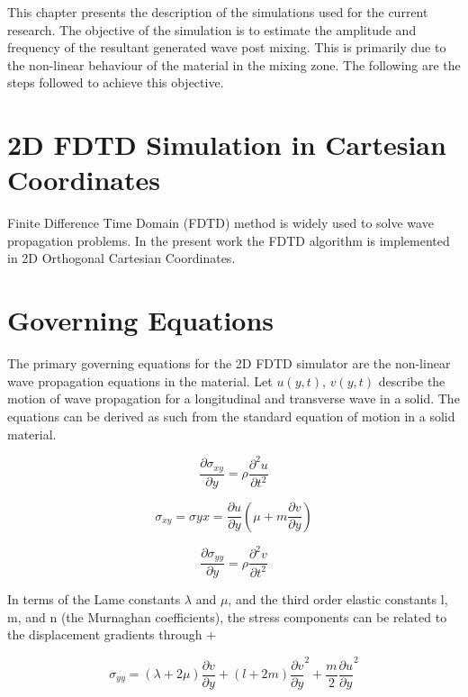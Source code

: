 This chapter presents the description of the simulations used for the current research. The objective of the simulation is to estimate the amplitude and frequency of the resultant generated wave post mixing. This is primarily due to the non-linear behaviour of the material in the mixing zone. The following are the steps followed to achieve this objective.


\section{2D FDTD Simulation in Cartesian Coordinates}
Finite Difference Time Domain (FDTD) method is widely used to solve wave propagation problems. In the present work the FDTD algorithm is implemented in 2D Orthogonal Cartesian Coordinates. \cite{yee}
\section{Governing Equations}
The primary governing equations for the 2D FDTD simulator are the non-linear wave propagation equations in the material. Let $u(y,t)$, $v(y,t)$ describe the motion of wave propagation for a longitudinal and transverse wave in a solid.  The equations can be derived as such from the standard equation of motion in a solid material.


\begin{equation}
\frac{\partial \sigma_{xy}}{\partial y} = \rho \frac{\partial^2 u}{\partial t^2}
\end{equation}

\begin{equation}
\sigma_{xy} = \sigma{yx} = \frac{\partial u}{\partial y}(\mu + m\frac{\partial v}{\partial y})
\end{equation}

\begin{equation}
\frac{\partial \sigma_{yy}}{\partial y} = \rho \frac{\partial^2 v}{\partial t^2}
\end{equation}

In terms of the Lame constants $\lambda$ and $\mu$, and the third order elastic constants l, m, and n (the Murnaghan coefficients), the stress components can be related to the displacement gradients through + \cite{derive_step_1}

\begin{equation}
\sigma_{yy} = (\lambda + 2 \mu)\frac{\partial v}{\partial y} + (l + 2m)\frac{\partial v}{\partial y}^2 + \frac{m}{2}\frac{\partial u}{\partial y}^2
\end{equation}


